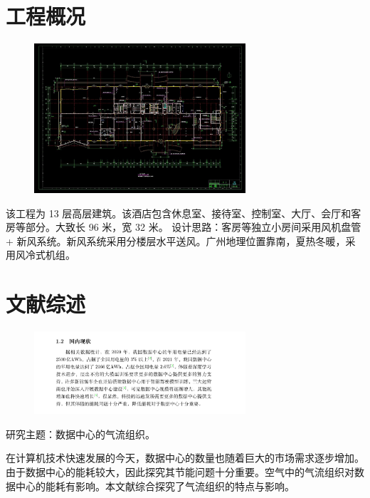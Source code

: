 \documentclass{beamer}
\begin{document}
\section{工程概况}
\begin{frame}
	\begin{figure}[htbp]
	\centering
	\includegraphics[width=0.7\textwidth]{figure_5}
	\end{figure}
\end{frame}

\begin{frame}
	该工程为 13 层高层建筑。该酒店包含休息室、接待室、控制室、大厅、会厅和客房等部分。大致长 96 米，宽 32 米。
	设计思路：客房等独立小房间采用风机盘管 + 新风系统。新风系统采用分楼层水平送风。广州地理位置靠南，夏热冬暖，采用风冷式机组。
\end{frame}

\section{文献综述}
\begin{frame}
	\begin{figure}[htbp]
	\centering
	\includegraphics[width=0.7\textwidth]{figure_6}
	\end{figure}
	研究主题：数据中心的气流组织。
\end{frame}

\begin{frame}
	在计算机技术快速发展的今天，数据中心的数量也随着巨大的市场需求逐步增加。由于数据中心的能耗较大，因此探究其节能问题十分重要。空气中的气流组织对数据中心的能耗有影响。本文献综合探究了气流组织的特点与影响。
\end{frame}
\end{document}
